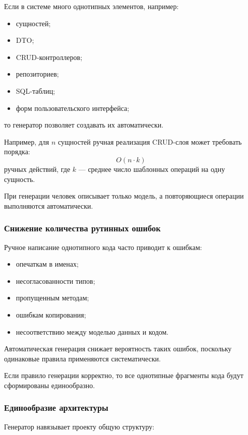 \documentclass[12pt,a4paper]{article}
\begin{document}
Если в системе много однотипных элементов, например:

\begin{itemize}
    \item сущностей;
    \item DTO;
    \item CRUD-контроллеров;
    \item репозиториев;
    \item SQL-таблиц;
    \item форм пользовательского интерфейса;
\end{itemize}

то генератор позволяет создавать их автоматически.

Например, для $n$ сущностей ручная реализация CRUD-слоя может требовать порядка:
\[
    O(n \cdot k)
\]
ручных действий, где $k$ --- среднее число шаблонных операций на одну сущность.

При генерации человек описывает только модель, а повторяющиеся операции выполняются автоматически.

\subsubsection{Снижение количества рутинных ошибок}

Ручное написание однотипного кода часто приводит к ошибкам:

\begin{itemize}
    \item опечаткам в именах;
    \item несогласованности типов;
    \item пропущенным методам;
    \item ошибкам копирования;
    \item несоответствию между моделью данных и кодом.
\end{itemize}

Автоматическая генерация снижает вероятность таких ошибок, поскольку одинаковые правила применяются систематически.

Если правило генерации корректно, то все однотипные фрагменты кода будут сформированы единообразно.

\subsubsection{Единообразие архитектуры}

Генератор навязывает проекту общую структуру:
\end{document}
